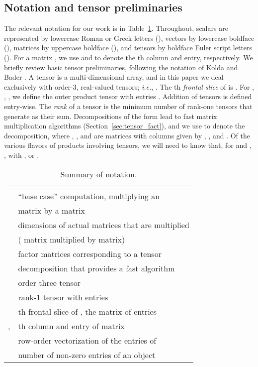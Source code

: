 \documentclass[preprint]{sigplanconf}
\begin{document}
\subsection{Notation and tensor preliminaries}

The relevant notation for our work is in Table~\ref{tab:notation}.
Throughout, scalars are represented by lowercase Roman or Greek letters (), vectors by lowercase boldface (),
matrices by uppercase boldface (), and tensors by boldface Euler script letters ().
For a matrix , we use  and  to denote the th column and  entry, respectively.
We briefly review basic tensor preliminaries, following the notation of Kolda and Bader \cite{kolda2009tensor}.
A tensor is a multi-dimensional array, and in this paper we deal exclusively with order-3, real-valued tensors; \emph{i.e.}, .
The th \emph{frontal slice} of  is .
For , , , we define the outer product tensor
 with entries .
Addition of tensors is defined entry-wise.
The \emph{rank} of a tensor  is the minimum number of rank-one tensors that generate  as their sum.
Decompositions of the form  lead to fast matrix multiplication algorithms (Section~\ref{sec:tensor_fact}), and we use  to denote the decomposition, where , , and  are matrices with  columns given by , , and .
Of the various flavors of products involving tensors, we will need to know that, for  and ,
, with , or .

\begin{table}[tb]
\centering
\caption{
Summary of notation.
}
\begin{tabular}{l l}
\toprule \\
 & ``base case'' computation, multiplying an   \\
& matrix by a  matrix \\
 & dimensions of actual matrices that are multiplied \\
& ( matrix multiplied by  matrix) \\
 & factor matrices corresponding to a tensor \\
& decomposition that provides a fast algorithm \\
 & order three tensor \\
 & rank-1 tensor with entries  \\
 & th frontal slice of , the matrix of entries  \\
,  & th column and  entry of matrix  \\
 & row-order vectorization of the entries of  \\
 & number of non-zero entries of an object \\
\bottomrule
\end{tabular}
\label{tab:notation}
\end{table}
\end{document}
